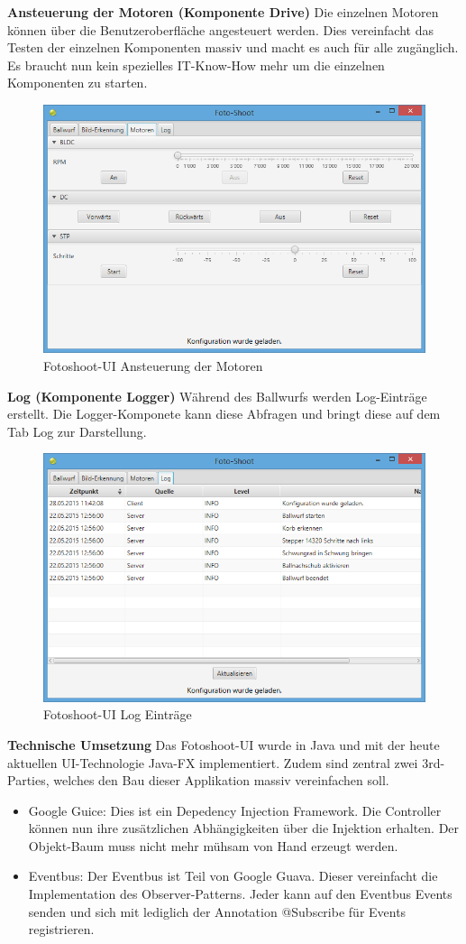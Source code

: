 \newpage
\noindent
\textbf{Ansteuerung der Motoren (Komponente Drive)}
Die einzelnen Motoren können über die Benutzeroberfläche angesteuert werden. Dies vereinfacht das Testen der einzelnen Komponenten massiv und macht es auch für alle zugänglich. Es braucht nun kein spezielles IT-Know-How mehr um die einzelnen Komponenten zu starten.

\begin{figure}[h!]
	\centering
	\includegraphics[width=0.6\linewidth]{../../fig/fotoshoot-ui/fotoshoot-ui-motoren}
	\caption{Fotoshoot-UI Ansteuerung der Motoren}
	\label{fig:fotoshoot-ui-motoren}
\end{figure}

\noindent
\textbf{Log (Komponente Logger)}
Während des Ballwurfs werden Log-Einträge erstellt. Die Logger-Komponete kann diese Abfragen und bringt diese auf dem Tab Log zur Darstellung.

\begin{figure}[h!]
	\centering
	\includegraphics[width=0.6\linewidth]{../../fig/fotoshoot-ui/fotoshoot-ui-log}
	\caption{Fotoshoot-UI Log Einträge}
	\label{fig:fotoshoot-ui-log}
\end{figure}

\newpage
\noindent
\textbf{Technische Umsetzung}
Das Fotoshoot-UI wurde in Java und mit der heute aktuellen UI-Technologie Java-FX implementiert. Zudem sind zentral zwei 3rd-Parties, welches den Bau dieser Applikation massiv vereinfachen soll.

\begin{itemize}
	\item Google Guice: Dies ist ein Depedency Injection Framework. Die Controller können nun ihre zusätzlichen Abhängigkeiten über die Injektion erhalten. Der Objekt-Baum muss nicht mehr mühsam von Hand erzeugt werden.
	\item Eventbus: Der Eventbus ist Teil von Google Guava. Dieser vereinfacht die Implementation des Observer-Patterns. Jeder kann auf den Eventbus Events senden und sich mit lediglich der Annotation @Subscribe für Events registrieren.
\end{itemize}
	
